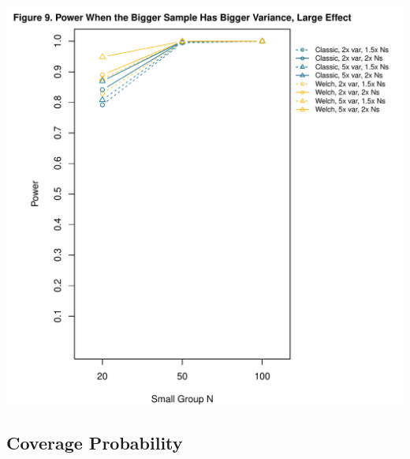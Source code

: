 \documentclass[man]{apa6}\usepackage[]{graphicx}\usepackage[]{color}
\makeatletter
\def\maxwidth{ %
  \ifdim\Gin@nat@width>\linewidth
    \linewidth
  \else
    \Gin@nat@width
  \fi
}
\newenvironment{knitrout}{}{} %
\makeatother
\begin{document}
\begin{knitrout}
\includegraphics[width=\maxwidth]{figure/ssv_power3} 

\end{knitrout}

\subsection{Coverage Probability}
\end{document}
